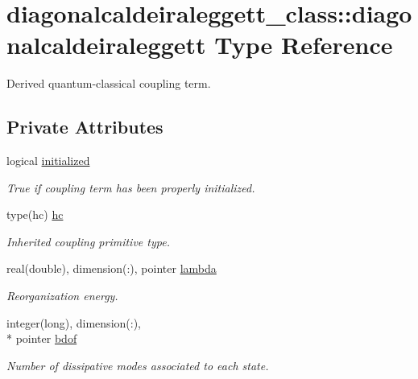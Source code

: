 \hypertarget{structdiagonalcaldeiraleggett__class_1_1diagonalcaldeiraleggett}{\section{diagonalcaldeiraleggett\+\_\+class\+:\+:diagonalcaldeiraleggett Type Reference}
\label{structdiagonalcaldeiraleggett__class_1_1diagonalcaldeiraleggett}
}


Derived quantum-\/classical coupling term.  


\subsection*{Private Attributes}
\begin{DoxyCompactItemize}
\item 
logical \hyperlink{structdiagonalcaldeiraleggett__class_1_1diagonalcaldeiraleggett_a2d82d59f44c03c02828f6e8a98143d10}{initialized}
\begin{DoxyCompactList}\small\item\em True if coupling term has been properly initialized. \end{DoxyCompactList}\item 
type(hc) \hyperlink{structdiagonalcaldeiraleggett__class_1_1diagonalcaldeiraleggett_ac3c92c8b85d575c978c65148bd3a85b0}{hc}
\begin{DoxyCompactList}\small\item\em Inherited coupling primitive type. \end{DoxyCompactList}\item 
real(double), dimension(\+:), pointer \hyperlink{structdiagonalcaldeiraleggett__class_1_1diagonalcaldeiraleggett_a7a47834c87e167dbdc0dae14bff60980}{lambda}
\begin{DoxyCompactList}\small\item\em Reorganization energy. \end{DoxyCompactList}\item 
integer(long), dimension(\+:), \\*
pointer \hyperlink{structdiagonalcaldeiraleggett__class_1_1diagonalcaldeiraleggett_a0cab6aa9f54eaf72a27628ed28f94746}{bdof}
\begin{DoxyCompactList}\small\item\em Number of dissipative modes associated to each state. \end{DoxyCompactList}\item 

\end{DoxyCompactItemize}
